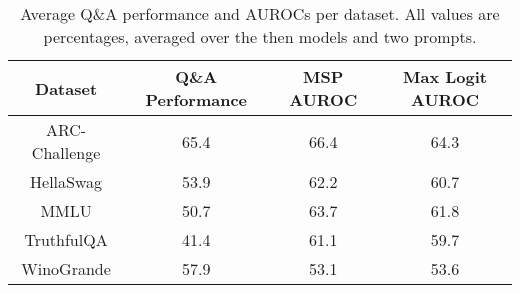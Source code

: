 \begin{table*}
\centering
\begin{tabular}{c|c|c|c}
Dataset & Q\&A Performance & MSP AUROC & Max Logit AUROC\\ \hline
ARC-Challenge & 65.4 & 66.4 & 64.3\\
HellaSwag & 53.9 & 62.2 & 60.7\\
MMLU & 50.7 & 63.7 & 61.8\\
TruthfulQA & 41.4 & 61.1 & 59.7\\
WinoGrande & 57.9 & 53.1 & 53.6\\
\hline
\end{tabular}
\caption{Average Q\&A performance and AUROCs per dataset. All values are percentages, averaged over the then models and two prompts.}
\label{tab:dataset}
\end{table*}
